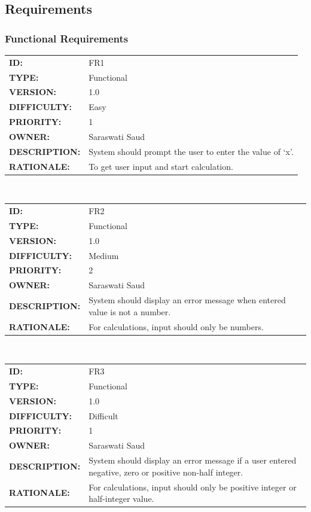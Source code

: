 \documentclass[a4paper,12pt]{article}
\begin{document}
    \subsection{Requirements}
        \subsubsection{Functional Requirements}
        \begin{tabular}{ |p{4cm} | p{11cm}| }
            \hline
            \textbf{ID:} & FR1\\
            \textbf{TYPE:} & Functional\\
            \textbf{VERSION:} & 1.0\\
            \textbf{DIFFICULTY:} & Easy\\
            \textbf{PRIORITY:} & 1\\
            \textbf{OWNER:} & Saraswati Saud\\
            \textbf{DESCRIPTION:} & System should prompt the user to enter the value of ‘x’. \\
            \textbf{RATIONALE:} & To get user input and start calculation. \\
            \hline
        \end{tabular}
        \\[10pt]
        \begin{tabular}{ |p{4cm} | p{11cm}| }
            \hline
            \textbf{ID:} & FR2\\
            \textbf{TYPE:} & Functional\\
            \textbf{VERSION:} & 1.0\\
            \textbf{DIFFICULTY:} & Medium\\
            \textbf{PRIORITY:} & 2\\
            \textbf{OWNER:} & Saraswati Saud\\
            \textbf{DESCRIPTION:} & System should display an error message when entered value is not   a number. \\
            \textbf{RATIONALE:} & For calculations, input should only be numbers. \\
            \hline
        \end{tabular}
        \\[10pt]
        \begin{tabular}{ |p{4cm} | p{11cm}| }
            \hline
            \textbf{ID:} & FR3\\
            \textbf{TYPE:} & Functional\\
            \textbf{VERSION:} & 1.0\\
            \textbf{DIFFICULTY:} & Difficult\\
            \textbf{PRIORITY:} & 1\\
            \textbf{OWNER:} & Saraswati Saud\\
            \textbf{DESCRIPTION:} & System should display an error message if a user entered negative, zero or positive non-half integer. \\
            \textbf{RATIONALE:} & For calculations, input should only be positive integer or half-integer value. \\
            \hline
        \end{tabular}
\end{document}
